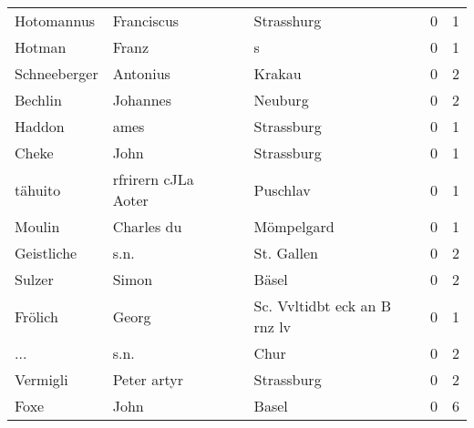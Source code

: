 \begin{tabular}{llllrr}
               Hotomannus &                         Franciscus &             &                                  Strasshurg &          0 &         1 \\
                   Hotman &                              Franz &             &                                           s &          0 &         1 \\
             Schneeberger &                           Antonius &             &                                      Krakau &          0 &         2 \\
                  Bechlin &                           Johannes &             &                                     Neuburg &          0 &         2 \\
                   Haddon &                               ames &             &                                  Strassburg &          0 &         1 \\
                    Cheke &                               John &             &                                  Strassburg &          0 &         1 \\
                  tähuito &                rfrirern cJLa Aoter &             &                                    Puschlav &          0 &         1 \\
                   Moulin &                         Charles du &             &                                  Mömpelgard &          0 &         1 \\
               Geistliche &                               s.n. &             &                                  St. Gallen &          0 &         2 \\
                   Sulzer &                              Simon &             &                                       Bäsel &          0 &         2 \\
                  Frölich &                              Georg &             &                Sc. Vvltidbt eck an B rnz lv &          0 &         1 \\
                      ... &                               s.n. &             &                                        Chur &          0 &         2 \\
                 Vermigli &                        Peter artyr &             &                                  Strassburg &          0 &         2 \\
                     Foxe &                               John &             &                                       Basel &          0 &         6 \\

\end{tabular}

